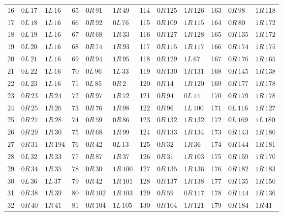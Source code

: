 \begin{longtable}{@{}rll@{\quad}rll@{\quad}rll@{\quad}rll@{}}
16 & $0L\,17$ & $1L\,16$ & 65 & $0R\,91$ & $1R\,49$ & 114 & $0R\,125$ & $1R\,126$ & 163 & $0R\,98$ & $1R\,118$\\
17 & $0L\,18$ & $1L\,16$ & 66 & $0R\,92$ & $0L\,76$ & 115 & $0R\,109$ & $1R\,115$ & 164 & $0R\,80$ & $1R\,172$\\
18 & $0L\,19$ & $1L\,16$ & 67 & $0R\,68$ & $1R\,33$ & 116 & $0R\,127$ & $1R\,128$ & 165 & $0R\,135$ & $1R\,172$\\
19 & $0L\,20$ & $1L\,16$ & 68 & $0R\,74$ & $1R\,93$ & 117 & $0R\,115$ & $1R\,117$ & 166 & $0R\,174$ & $1R\,175$\\
20 & $0L\,21$ & $1L\,16$ & 69 & $0R\,94$ & $1R\,95$ & 118 & $0R\,129$ & $1L\,67$ & 167 & $0R\,176$ & $1R\,165$\\
21 & $0L\,22$ & $1L\,16$ & 70 & $0L\,96$ & $1L\,33$ & 119 & $0R\,130$ & $1R\,131$ & 168 & $0R\,145$ & $1R\,138$\\
22 & $0L\,23$ & $1L\,16$ & 71 & $0L\,85$ & $0R\,2$ & 120 & $0R\,14$ & $1R\,120$ & 169 & $0R\,177$ & $1R\,178$\\
23 & $0R\,23$ & $1R\,24$ & 72 & $0R\,97$ & $1R\,72$ & 121 & $0R\,94$ & $0L\,14$ & 170 & $0R\,179$ & $1R\,178$\\
24 & $0R\,25$ & $1R\,26$ & 73 & $0R\,76$ & $1R\,98$ & 122 & $0R\,96$ & $1L\,100$ & 171 & $0L\,116$ & $1R\,127$\\
25 & $0R\,27$ & $1R\,28$ & 74 & $0R\,59$ & $0R\,86$ & 123 & $0R\,132$ & $1R\,132$ & 172 & $0L\,169$ & $1L\,180$\\
26 & $0R\,29$ & $1R\,30$ & 75 & $0R\,68$ & $1R\,99$ & 124 & $0R\,133$ & $1R\,134$ & 173 & $0R\,143$ & $1R\,180$\\
27 & $0R\,31$ & $1R\,194$ & 76 & $0R\,42$ & $0L\,13$ & 125 & $0R\,32$ & $1R\,36$ & 174 & $0R\,144$ & $1R\,181$\\
28 & $0L\,32$ & $1R\,33$ & 77 & $0R\,87$ & $1R\,37$ & 126 & $0R\,31$ & $1R\,103$ & 175 & $0R\,159$ & $1R\,170$\\
29 & $0R\,34$ & $1R\,35$ & 78 & $0R\,30$ & $1R\,100$ & 127 & $0R\,135$ & $1R\,136$ & 176 & $0R\,182$ & $1R\,183$\\
30 & $0L\,36$ & $1L\,37$ & 79 & $0R\,42$ & $1R\,101$ & 128 & $0R\,137$ & $1R\,138$ & 177 & $0R\,135$ & $1R\,150$\\
31 & $0R\,38$ & $1R\,39$ & 80 & $0R\,102$ & $1R\,103$ & 129 & $0R\,59$ & $0R\,117$ & 178 & $0R\,144$ & $1R\,136$\\
32 & $0R\,40$ & $1R\,41$ & 81 & $0R\,104$ & $1L\,105$ & 130 & $0R\,104$ & $1R\,121$ & 179 & $0R\,184$ & $1R\,41$\\

\end{longtable}
